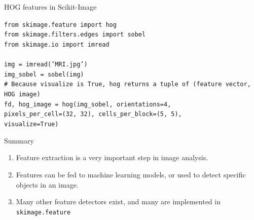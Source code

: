 \documentclass[9pt, aspectratio=169]{beamer}
\begin{document}
\begin{frame}
    {HOG features in Scikit-Image}
    \begin{codebox}
        \texttt{from skimage.feature import hog\\
            from skimage.filters.edges import sobel\\
            from skimage.io import imread\\
            \\
            img = imread('MRI.jpg')\\
            img\_sobel = sobel(img)\\
            \# Because visualize is True, hog returns a tuple of  (feature vector, HOG image)\\
            fd, hog\_image = hog(img\_sobel, orientations=4,\\
            pixels\_per\_cell=(32, 32), cells\_per\_block=(5, 5),\\
            visualize=True)}
    \end{codebox}
\end{frame}

\begin{frame}
{Summary}

\begin{enumerate}
\item Feature extraction is a very important step in image analysis.
\item Features can be fed to machine learning models, or used to detect specific objects in an image.
\item Many other feature detectors exist, and many are implemented in \texttt{skimage.feature} 
\end{enumerate}

\end{frame}
\end{document}
